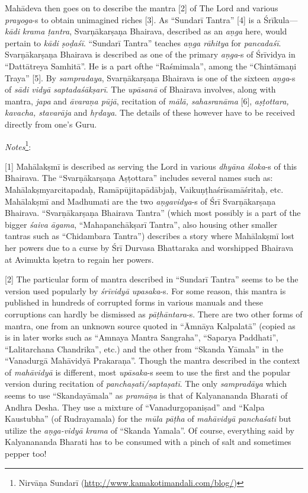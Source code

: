 \documentclass[12pt,oneside,a4paper]{article}
\newcommand{\tl}[1]{\emph{#1}}
\begin{document}
Mahādeva then goes on to describe the mantra [2] of The Lord and various
\tl{prayoga}-s to obtain unimagined riches [3]. As ``Sundarī Tantra'' [4] is
a Śrīkula---\tl{kādi krama ṭantra}, Svarṇākarṣaṇa Bhairava, described as
an \tl{aṇga} here, would pertain to \tl{kādi ṣoḍaśī}. ``Sundarī Tantra'' teaches
\tl{aṇga rāhitya} for \tl{pancadaśī}. Svarṇākarṣaṇa Bhairava is described as
one of the primary \tl{aṇga}-s of Śrīvidya in ``Dattātreya Samhitā''. He is
a part ofthe ``Raśmimala'', among the ``Chintāmaṇi Traya'' [5]. By
\tl{sampradaya}, Svarṇākarṣaṇa Bhairava is one of the sixteen \tl{aṇga}-s of
\tl{sādi vidyā saptadaśākṣarī}. The \tl{upāsanā} of Bhairava involves, along
with mantra, \tl{japa} and \tl{āvaraṇa pūjā}, recitation of \tl{mālā,
sahasranāma} [6], \tl{aṣṭottara, kavacha, stavarāja} and \tl{hṛdaya}.
The details of these however have to be received directly from one's Guru.

\textit{Notes}\footnote{Nirvāṇa Sundarī (\url{http://www.kamakotimandali.com/blog/})}:

[1] Mahālakṣmī is described as serving the Lord in various \tl{dhyāna śloka}-s
of this Bhairava. The ``Svarṇākarṣaṇa Aṣṭottara'' includes several names such
as: Mahālakṣmyarcitapadaḥ, Ramāpūjitapādābjaḥ, Vaikuṇṭhaśrīsamāśritaḥ, etc.
Mahālakṣmī and Madhumati are the two \tl{aṇgavidya}-s of Śrī Svarṇākarṣaṇa
Bhairava. ``Svarṇākarṣaṇa Bhairava Tantra'' (which most possibly is a part of
the bigger \tl{śaiva āgama}, ``Mahapanchākṣarī Tantra'', also housing other
smaller tantras such as ``Chidambara Tantra'') describes a story where
Mahālakṣmī lost her powers due to a curse by Śrī Durvasa Bhattaraka and
worshipped Bhairava at Avimukta kṣetra to regain her powers.

[2] The particular form of mantra described in ``Sundarī Tantra'' seems to be
the version used popularly by \tl{śrīvidyā upasaka}-s. For some reason, this
mantra is published in hundreds of corrupted forms in various manuals and these
corruptions can hardly be dismissed as \tl{pāṭhāntara}-s. There are two other
forms of mantra, one from an unknown source quoted in ``Āmnāya Kalpalatā'' (copied
as is in later works such as ``Amnaya Mantra Sangraha'', ``Saparya Paddhati'',
``Lalitarchana Chandrika'', etc.) and the other from ``Skanda Yāmala'' in
the ``Vanadurgā Mahāvidyā Prakaraṇa''. Though the mantra described in the context of
\tl{mahāvidyā} is different, most \tl{upāsaka}-s seem to use the first and
the popular version during recitation of \tl{panchaṣatī/saptaṣatī}. The only
\tl{sampradāya} which seems to use ``Skandayāmala'' as \tl{pramāṇa} is that of
Kalyanananda Bharati of Andhra Desha. They use a mixture of ``Vanadurgopaniṣad''
and ``Kalpa Kaustubha'' (of Rudrayamala) for the \tl{mūla pāṭha} of \tl{mahāvidyā
panchaśati} but utilize the \tl{aṇga-vidyā krama} of ``Skanda Yamala''. Of course,
everything said by Kalyanananda Bharati has to be consumed with a pinch of salt
and sometimes pepper too!
\end{document}
